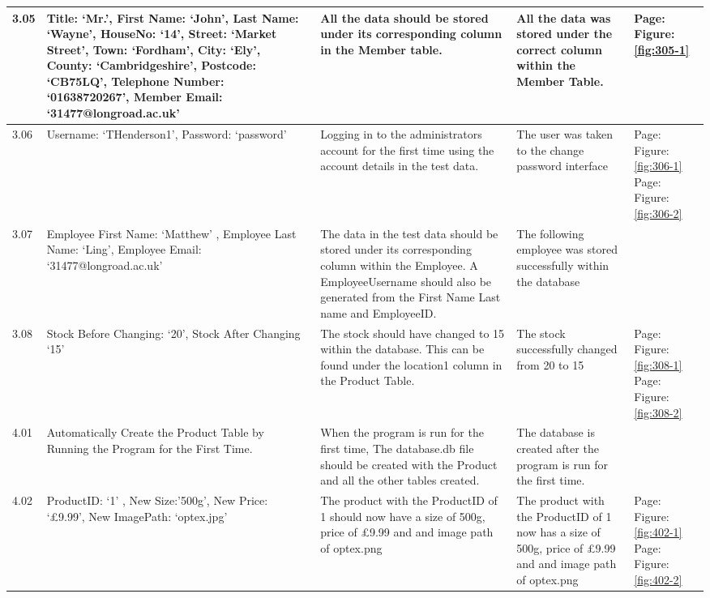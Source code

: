 \begin{flushleft}
\begin{longtable}{|p{1.0cm}|p{2.5cm}|p{3cm}|p{3.0cm}|p{2.5cm}|}
	3.05 &  Title: `Mr.', First Name: `John', Last Name: `Wayne', HouseNo: `14', Street: `Market Street', Town: `Fordham', City: `Ely', County: `Cambridgeshire', Postcode: `CB75LQ', Telephone Number: `01638720267', Member Email: `31477@longroad.ac.uk' & All the data should be stored under its corresponding column in the Member table.& All the data was stored under the correct column within the Member Table.&  Page:\pageref{fig:305-1}  \newline Figure:\ref{fig:305-1}\\ \hline
	3.06 &  Username: `THenderson1', Password: `password' & Logging in to the administrators account for the first time using the account details in the test data.  & The user was taken to the change password interface &  Page:\pageref{fig:306-1}  \newline Figure:\ref{fig:306-1} \newline \newline  Page:\pageref{fig:306-2}  \newline Figure:\ref{fig:306-2} \\ \hline
	3.07 & Employee First Name: `Matthew' , Employee Last Name: `Ling', Employee Email: `31477@longroad.ac.uk' & The data in the test data should be stored under its corresponding column within the Employee. A EmployeeUsername should also be generated from the First Name Last name and EmployeeID. & The following employee was stored successfully within the database& \\ \hline
	3.08 &  Stock Before Changing: `20', Stock After Changing `15'  & The stock should have changed to 15 within the database. This can be found under the location1 column in the Product Table.& The stock successfully changed from 20 to 15& Page:\pageref{fig:308-1}  \newline Figure:\ref{fig:308-1} \newline \newline  Page:\pageref{fig:308-2}  \newline Figure:\ref{fig:308-2} \\ \hline
	4.01 & Automatically Create the Product Table by Running the Program for the First Time. & When the program is run for the first time, The database.db file should be created with the Product and all the other tables created. & The database is created after the program is run for the first time. &  \\ \hline
	4.02 & ProductID: `1' ,  New Size:'500g', New Price: `£9.99',  New ImagePath: `optex.jpg' & The product with the ProductID of 1 should now have a size of 500g, price of £9.99 and and image path of optex.png& The product with the ProductID of 1 now has a size of 500g, price of £9.99 and and image path of optex.png& Page:\pageref{fig:402-1}  \newline Figure:\ref{fig:402-1} \newline \newline  Page:\pageref{fig:402-2}  \newline Figure:\ref{fig:402-2}   \\ \hline

\end{longtable}
\end{flushleft}
